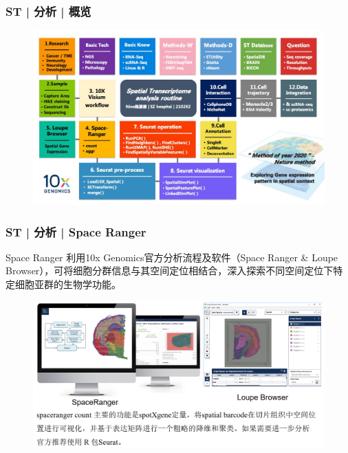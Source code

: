 \documentclass[11pt]{ctexbeamer}
\begin{document}
\begin{frame}
	\frametitle{ST | 分析 | 概览}
	\begin{figure}
	\includegraphics[width=\textwidth]{ST_route.png}
    \end{figure}
\end{frame}

\begin{frame}
	\frametitle{ST | 分析 | Space Ranger}
	\begin{block}{Space Ranger}
	利用10x Genomics官方分析流程及软件（Space Ranger \& Loupe Browser），可将细胞分群信息与其空间定位相结合，深入探索不同空间定位下特定细胞亚群的生物学功能。
	\end{block}
    \begin{figure}
    	\includegraphics[width=\textwidth]{ST_spaceranger_02.png}
    \end{figure}
\end{frame}
\end{document}
